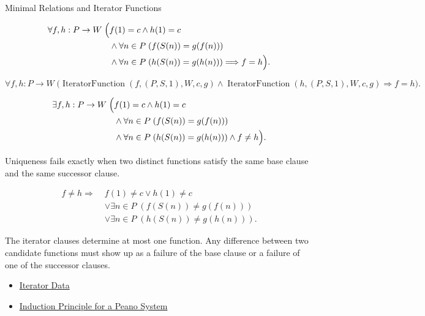 \begin{topicbox}{Minimal Relations and Iterator Functions}
\begin{remark*}
\[
\begin{aligned}
\forall f,h:P\to W\;\Bigl(&
f(1)=c\land h(1)=c\\
&\land \forall n\in P\;(f(S(n))=g(f(n)))\\
&\land \forall n\in P\;(h(S(n))=g(h(n)))
\Longrightarrow f=h\Bigr).
\end{aligned}
\]
\end{remark*}

\begin{remark*}
\[
\forall f,h:P\to W\;
\bigl(\operatorname{IteratorFunction}(f,(P,S,1),W,c,g)
\land \operatorname{IteratorFunction}(h,(P,S,1),W,c,g)
\Longrightarrow f=h\bigr).
\]
\end{remark*}

\begin{remark*}
\[
\begin{aligned}
\exists f,h:P\to W\;\Bigl(&
f(1)=c\land h(1)=c\\
&\land \forall n\in P\;(f(S(n))=g(f(n)))\\
&\land \forall n\in P\;(h(S(n))=g(h(n)))
\land f\neq h\Bigr).
\end{aligned}
\]
\end{remark*}

\begin{remark*}
Uniqueness fails exactly when two distinct functions satisfy the same base
clause and the same successor clause.
\end{remark*}

\begin{remark*}
\[
\begin{aligned}
f\neq h
\Longrightarrow\;&
f(1)\neq c\lor h(1)\neq c\\
&\lor \exists n\in P\;(f(S(n))\neq g(f(n)))\\
&\lor \exists n\in P\;(h(S(n))\neq g(h(n))).
\end{aligned}
\]
\end{remark*}

\begin{remark*}[Interpretation]
The iterator clauses determine at most one function. Any difference between
two candidate functions must show up as a failure of the base clause or a
failure of one of the successor clauses.
\end{remark*}

\begin{dependencies}
\begin{itemize}
  \item \hyperref[def:iterator-data-on-peano-system]{Iterator Data}
  \item \hyperref[thm:induction-principle-for-peano-system]{Induction Principle for a Peano System}
\end{itemize}
\end{dependencies}


\end{topicbox}
